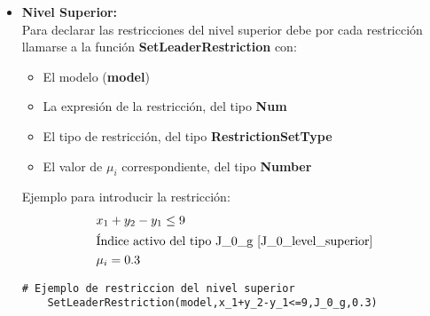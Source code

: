\begin{itemize}
    \item \textbf{Nivel Superior:}\\

Para declarar las restricciones del nivel superior debe por cada restricción
llamarse a la función \textbf{SetLeaderRestriction} con:
\begin{itemize}
    \item El modelo (\textbf{model})
    \item La expresión de la restricción, del tipo \textbf{Num}
    \item El tipo de restricción, del tipo \textbf{RestrictionSetType}
    \item El valor de $\mu_i$ correspondiente, del tipo \textbf{Number} 
\end{itemize}

Ejemplo para introducir la restricción:
\begin{align*}
    &x_1+y_2-y_1 \leq 9 \\
    &\text{Índice activo del tipo J\_0\_g \refeq{J_0_level_superior}}\\
    & \mu_i=0.3
\end{align*}

\begin{lstlisting}[caption={Introducir restricción del nivel superior}]
    # Ejemplo de restriccion del nivel superior
    SetLeaderRestriction(model,x_1+y_2-y_1<=9,J_0_g,0.3)
\end{lstlisting}

\end{itemize}
